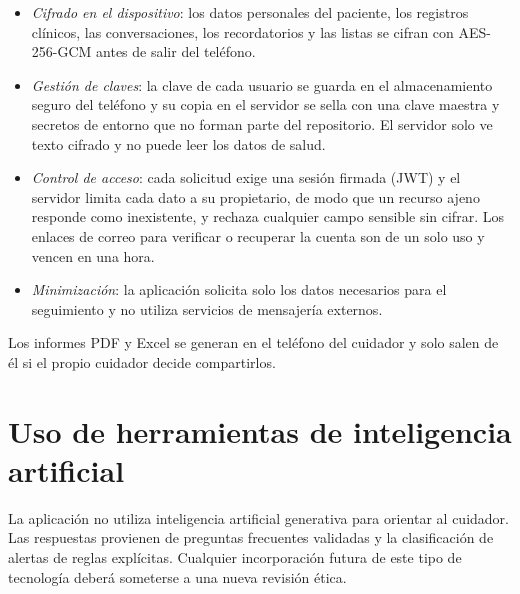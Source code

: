 \begin{itemize}
    \item \emph{Cifrado en el dispositivo}: los datos personales del paciente,
    los registros clínicos, las conversaciones, los recordatorios y las listas
    se cifran con AES-256-GCM antes de salir del teléfono.
    \item \emph{Gestión de claves}: la clave de cada usuario se guarda en el
    almacenamiento seguro del teléfono y su copia en el servidor se sella con
    una clave maestra y secretos de entorno que no forman parte del
    repositorio. El servidor solo ve texto cifrado y no puede leer los datos de
    salud.
    \item \emph{Control de acceso}: cada solicitud exige una sesión firmada
    (JWT) y el servidor limita cada dato a su propietario, de modo que un
    recurso ajeno responde como inexistente, y rechaza cualquier campo sensible
    sin cifrar. Los enlaces de correo para verificar o recuperar la cuenta son
    de un solo uso y vencen en una hora.
    \item \emph{Minimización}: la aplicación solicita solo los datos necesarios
    para el seguimiento y no utiliza servicios de mensajería externos.
\end{itemize}

Los informes PDF y Excel se generan en el teléfono del cuidador y solo salen de
él si el propio cuidador decide compartirlos.

\section{Uso de herramientas de inteligencia artificial}

La aplicación no utiliza inteligencia artificial generativa para orientar al
cuidador. Las respuestas provienen de preguntas frecuentes validadas y la
clasificación de alertas de reglas explícitas. Cualquier incorporación futura de
este tipo de tecnología deberá someterse a una nueva revisión ética.
